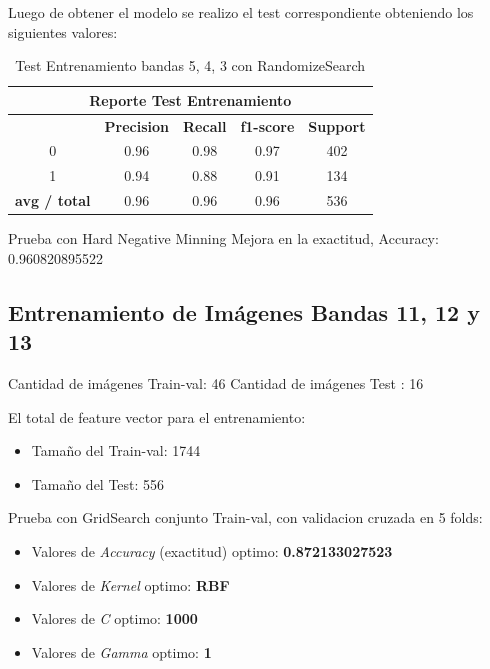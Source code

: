 Luego de obtener el modelo se realizo el test correspondiente obteniendo los siguientes valores:
\begin{table}[H]
\begin{center}
\begin{tabular}{|c|c|c|c|c|}
\hline \multicolumn{5}{|c|}{Reporte Test Entrenamiento} \\ \hline
\hline \textbf{} & \textbf{Precision} & \textbf{Recall} & \textbf{f1-score} & \textbf{Support}\\ \hline 
				 0   & 0.96 & 0.98 & 0.97  & 402	\\ \hline 
				 1   & 0.94 & 0.88  & 0.91 & 134 \\ \hline 
\textbf{avg / total} & 0.96 & 0.96 & 0.96  & 536 \\ \hline
\end{tabular}
\end{center} \caption{Test Entrenamiento bandas 5, 4, 3 con RandomizeSearch}\label{tab:RandomTest1075}
\end{table}


Prueba con Hard Negative Minning
Mejora en la exactitud, Accuracy: 0.960820895522



\subsection{Entrenamiento de Imágenes Bandas 11, 12 y 13}\label{sub:entrenamiento_bandas1111213}

Cantidad de imágenes Train-val: 46 
Cantidad de imágenes Test : 16  

El total de feature vector para el entrenamiento:
\begin{itemize}
\item Tamaño del Train-val: 1744
\item Tamaño del Test: 556
\end{itemize}

Prueba con GridSearch conjunto Train-val, con validacion cruzada en 5 folds:

\begin{itemize}
\item Valores de \textit{Accuracy} (exactitud) optimo: \textbf{0.872133027523}
\item Valores de \textit{Kernel} optimo: \textbf{RBF}
\item Valores de \textit{C} optimo: \textbf{1000}
\item Valores de \textit{Gamma} optimo: \textbf{1}
\end{itemize}

